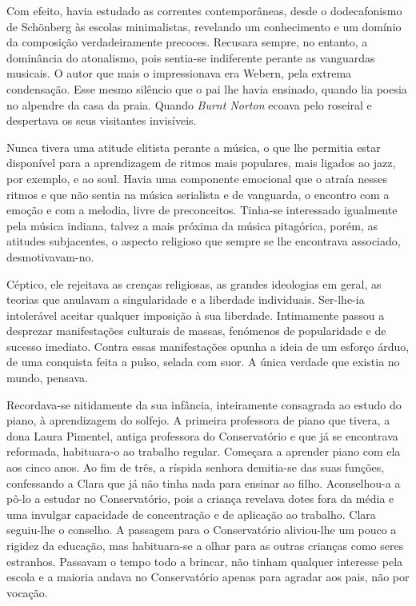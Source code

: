 Com efeito, havia estudado as correntes contemporâneas, desde o
dodecafonismo de Schönberg às escolas minimalistas, revelando um
conhecimento e um domínio da composição verdadeiramente precoces.
Recusara sempre, no entanto, a dominância do atonalismo, pois sentia-se
indiferente perante as vanguardas musicais. O autor que mais o
impressionava era Webern, pela extrema condensação. Esse mesmo silêncio
que o pai lhe havia ensinado, quando lia poesia no alpendre da casa da
praia. Quando \emph{Burnt Norton }ecoava pelo roseiral e despertava os
seus visitantes invisíveis.

Nunca tivera uma atitude elitista perante a música, o que lhe permitia
estar disponível para a aprendizagem de ritmos mais populares, mais
ligados ao jazz, por exemplo, e ao soul. Havia uma componente emocional
que o atraía nesses ritmos e que não sentia na música serialista e de
vanguarda, o encontro com a emoção e com a melodia, livre de
preconceitos. Tinha-se interessado igualmente pela música indiana,
talvez a mais próxima da música pitagórica, porém, as atitudes
subjacentes, o aspecto religioso que sempre se lhe encontrava associado,
desmotivavam-no.

Céptico, ele rejeitava as crenças religiosas, as grandes ideologias em
geral, as teorias que anulavam a singularidade e a liberdade
individuais. Ser-lhe-ia intolerável aceitar qualquer imposição à sua
liberdade. Intimamente passou a desprezar manifestações culturais de
massas, fenómenos de popularidade e de sucesso imediato. Contra essas
manifestações opunha a ideia de um esforço árduo, de uma conquista feita
a pulso, selada com suor. A única verdade que existia no mundo, pensava.

Recordava-se nitidamente da sua infância, inteiramente consagrada ao
estudo do piano, à aprendizagem do solfejo. A primeira professora de
piano que tivera, a dona Laura Pimentel, antiga professora do
Conservatório e que já se encontrava reformada, habituara-o ao trabalho
regular. Começara a aprender piano com ela aos cinco anos. Ao fim de
três, a ríspida senhora demitia-se das suas funções, confessando a Clara
que já não tinha nada para ensinar ao filho. Aconselhou-a a pô-lo a
estudar no Conservatório, pois a criança revelava dotes fora da média e
uma invulgar capacidade de concentração e de aplicação ao trabalho.
Clara seguiu-lhe o conselho. A passagem para o Conservatório aliviou-lhe
um pouco a rigidez da educação, mas habituara-se a olhar para as outras
crianças como seres estranhos. Passavam o tempo todo a brincar, não
tinham qualquer interesse pela escola e a maioria andava no
Conservatório apenas para agradar aos pais, não por vocação.

